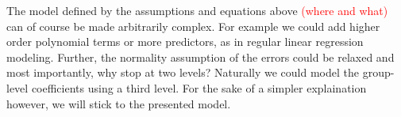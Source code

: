 The model defined by the assumptions and equations above \textcolor{red}{(where and what)} can of course be made
arbitrarily complex. For example we could add higher order polynomial terms or
more predictors, as in regular linear regression modeling. Further, the
normality assumption of the errors could be relaxed and most importantly, why
stop at two levels? Naturally we could model the group-level coefficients using
a third level. For the sake of a simpler explaination however, we will stick to
the presented model.

%
